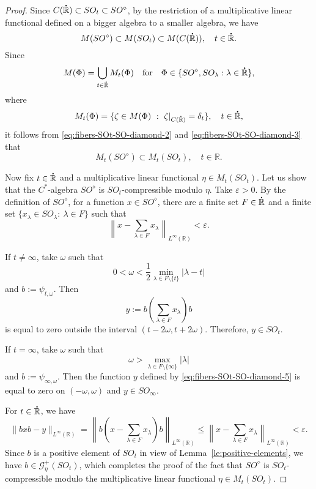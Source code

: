 \documentclass{birkjour}
\numberwithin{equation}{section}
\newcommand{\R}{\mathbb{R}}
\newcommand{\eps}{\varepsilon}
\newcommand{\dR}{{\bf\dot{\R}}}
\begin{document}
\begin{proof}
Since $C(\dR)\subset SO_t\subset SO^\diamond$, by the restriction of a
multiplicative linear functional defined on a bigger algebra to a smaller
algebra, we have
\begin{equation}\label{eq:fibers-SOt-SO-diamond-2}
M(SO^\diamond)\subset M(SO_t)\subset M(C(\dR)),
\quad t\in\dR.
\end{equation}
Since
\[
M(\Phi)=\bigcup_{t\in\dR}M_t(\Phi)
\quad\mbox{for}\quad
\Phi\in\{SO^\diamond,SO_\lambda:\lambda\in\dR\},
\]
where
\begin{equation}\label{eq:fibers-SOt-SO-diamond-3}
M_t(\Phi)=\{\zeta\in M(\Phi)\ : \ \zeta|_{C(\dR)}=\delta_t\},
\quad t\in\dR,
\end{equation}
it follows from \eqref{eq:fibers-SOt-SO-diamond-2}
and \eqref{eq:fibers-SOt-SO-diamond-3} that
\begin{equation}\label{eq:fibers-SOt-SO-diamond-4}
M_t(SO^\diamond)\subset M_t(SO_t),
\quad
t\in\R.
\end{equation}

Now fix $t\in\dR$ and a multiplicative linear functional $\eta\in M_t(SO_t)$.
Let us show that the $C^*$-algebra $SO^\diamond$ is $SO_t$-compressible
modulo $\eta$. Take $\eps>0$. By the definition of $SO^\diamond$, for a
function $x\in SO^\diamond$, there are a finite set $F\in\dR$ and
a finite set $\{x_\lambda\in SO_\lambda:\ \lambda\in F\}$ such that
\[
\left\|x-\sum_{\lambda\in F}x_\lambda\right\|_{L^\infty(\R)}<\eps.
\]

If $t\ne\infty$, take $\omega$ such that
\[
0<\omega<\frac{1}{2}\min_{\lambda\in F\setminus\{t\}}|\lambda-t|
\]
and $b:=\psi_{t,\omega}$. Then
\begin{equation}\label{eq:fibers-SOt-SO-diamond-5}
y:=b\left(\sum_{\lambda\in F}x_\lambda\right)b
\end{equation}
is equal to zero outside the interval $(t-2\omega,t+2\omega)$. Therefore,
$y\in SO_t$.

If $t=\infty$, take $\omega$ such that
\[
\omega>\max_{\lambda\in F\setminus\{\infty\}}|\lambda|
\]
and $b:=\psi_{\infty,\omega}$. Then the function $y$ defined by
\eqref{eq:fibers-SOt-SO-diamond-5} is equal to zero on $(-\omega,\omega)$
and $y\in SO_\infty$.

For $t\in\dR$, we have
\[
\|bxb-y\|_{L^\infty(\R)}
=
\left\|b\left(x-\sum_{\lambda\in F}x_\lambda\right)b\right\|_{L^\infty(\R)}
\le
\left\|x-\sum_{\lambda\in F}x_\lambda\right\|_{L^\infty(\R)}<\eps.
\]
Since $b$ is a positive element of $SO_t$ in view of
Lemma~\ref{le:positive-elements}, we have $b\in\mathcal{G}_\eta^+(SO_t)$,
which completes the proof of the fact that $SO^\diamond$ is
$SO_t$-compressible modulo the multiplicative linear functional
$\eta\in M_t(SO_t)$.


\end{proof}
\end{document}
